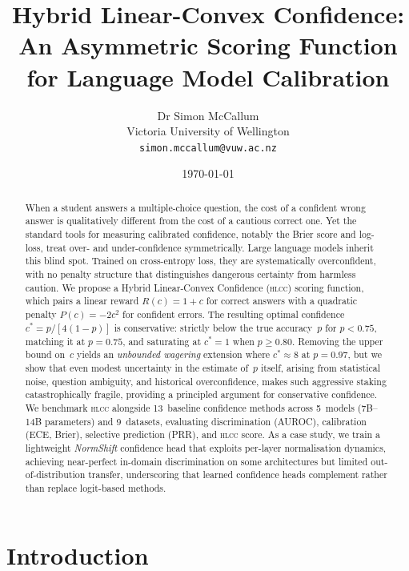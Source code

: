 \documentclass[11pt,a4paper]{article}
\title{Hybrid Linear-Convex Confidence:\\An Asymmetric Scoring Function for Language Model Calibration}
\author{
  Dr Simon McCallum\\
  Victoria University of Wellington\\
  \texttt{simon.mccallum@vuw.ac.nz}
}
\date{\today}
\newcommand{\hlcc}{\textsc{hlcc}}
\newcommand{\cstar}{c^{*}}
\begin{document}
\maketitle




\begin{abstract}
When a student answers a multiple-choice question, the cost of a
confident wrong answer is qualitatively different from the cost of a
cautious correct one.  Yet the standard tools for measuring
calibrated confidence, notably the Brier score and log-loss, treat
over- and under-confidence symmetrically.  Large language models
inherit this blind spot.  Trained on cross-entropy loss, they are
systematically overconfident, with no penalty structure that
distinguishes dangerous certainty from harmless caution.
We propose a Hybrid Linear-Convex Confidence (\hlcc{}) scoring
function, which pairs a linear reward $R(c) = 1{+}c$ for correct
answers with a quadratic penalty $P(c) = {-}2c^{2}$ for confident
errors.  The resulting optimal confidence
$\cstar = p/[4(1{-}p)]$ is conservative: strictly below the true
accuracy~$p$ for $p < 0.75$, matching it at $p = 0.75$, and
saturating at $\cstar = 1$ when $p \geq 0.80$.  Removing the upper
bound on~$c$ yields an \emph{unbounded wagering} extension where
$\cstar \approx 8$ at $p = 0.97$, but we show that even modest
uncertainty in the estimate of~$p$ itself, arising from statistical
noise, question ambiguity, and historical overconfidence, makes
such aggressive staking catastrophically fragile, providing a
principled argument for conservative confidence.
We benchmark \hlcc{} alongside 13~baseline confidence methods across
5~models (7B--14B parameters) and 9~datasets, evaluating
discrimination (AUROC), calibration (ECE, Brier), selective
prediction (PRR), and \hlcc{} score.  As a case study, we train a
lightweight \emph{NormShift} confidence head that exploits per-layer
normalisation dynamics, achieving near-perfect in-domain
discrimination on some architectures but limited out-of-distribution
transfer, underscoring that learned confidence heads complement
rather than replace logit-based methods.
\end{abstract}

\section{Introduction}
\label{sec:introduction}
\end{document}
